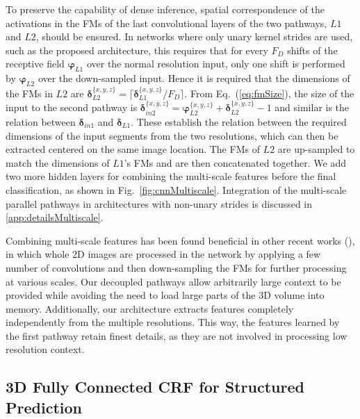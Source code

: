 

To preserve the capability of dense inference, spatial correspondence of the activations in the FMs of the last convolutional layers of the two pathways, $L1$ and $L2$, should be ensured. In networks  where only unary kernel strides are used, such as the proposed architecture, this requires that for every $F_D$ shifts of the receptive field $\boldsymbol{\varphi}_{L1}$ over the normal resolution input, only one shift is performed by $\boldsymbol{\varphi}_{L2}$ over the down-sampled input. Hence it is required that the dimensions of the FMs in $L2$ are $\boldsymbol{\delta}_{L2}^{\{ x,y,z\}} = \lceil \boldsymbol{\delta}_{L1}^{\{ x,y,z\}} / F_D \rceil$. From Eq.~(\ref{eq:fmSize}), the size of the input to the second pathway is $\boldsymbol{\delta}_{in2}^{\{ x,y,z\}} = \boldsymbol{\varphi}_{L2}^{\{ x,y,z\}} + \boldsymbol{\delta}_{L2}^{\{ x,y,z\}} -1 $ and similar is the relation between $\boldsymbol{\delta}_{in1}$ and $\boldsymbol{\delta}_{L1}$. These establish the relation between the required dimensions of the input segments from the two resolutions, which can then be extracted centered on the same image location. The FMs of $L2$ are up-sampled to match the dimensions of $L1$'s FMs and are then concatenated together. We add two more hidden layers for combining the multi-scale features before the final classification, as shown in Fig.~\ref{fig:cnnMultiscale}. Integration of the multi-scale parallel pathways in architectures with non-unary strides is discussed in \ref{app:detailsMultiscale}.

Combining multi-scale features has been found beneficial in other recent works (\cite{Long2014, Ronneberger2015}), in which whole 2D images are processed in the network by applying a few number of convolutions and then down-sampling the FMs for further processing at various scales. Our decoupled pathways allow arbitrarily large context to be provided while avoiding the need to load large parts of the 3D volume into memory. Additionally, our architecture extracts features completely independently from the multiple resolutions. This way, the features learned by the first pathway retain finest details, as they are not involved in processing low resolution context.

\subsection{3D Fully Connected CRF for Structured Prediction}
\label{subsec:3dFcCrf}

